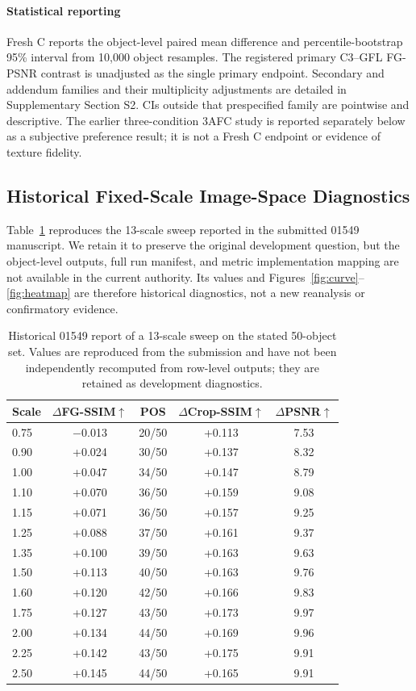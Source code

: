 \documentclass[times,twocolumn,final]{elsarticle}
\begin{document}
\paragraph{Statistical reporting}
Fresh C reports the object-level paired mean difference and percentile-bootstrap 95\% interval from 10{,}000 object resamples. The registered primary C3--GFL FG-PSNR contrast is unadjusted as the single primary endpoint. Secondary and addendum families and their multiplicity adjustments are detailed in Supplementary Section S2. CIs outside that prespecified family are pointwise and descriptive. The earlier three-condition 3AFC study is reported separately below as a subjective preference result; it is not a Fresh C endpoint or evidence of texture fidelity.

\subsection{Historical Fixed-Scale Image-Space Diagnostics}
\label{subsec:tradeoff}

Table~\ref{tab:sweep} reproduces the 13-scale sweep reported in the submitted 01549 manuscript. We retain it to preserve the original development question, but the object-level outputs, full run manifest, and metric implementation mapping are not available in the current authority. Its values and Figures~\ref{fig:curve}--\ref{fig:heatmap} are therefore historical diagnostics, not a new reanalysis or confirmatory evidence.

\begin{table}[t]
\centering
\caption{Historical 01549 report of a 13-scale sweep on the stated 50-object set. Values are reproduced from the submission and have not been independently recomputed from row-level outputs; they are retained as development diagnostics.}
\label{tab:sweep}
\small
\begin{tabular}{lcccc}
\toprule
Scale & $\Delta$FG-SSIM$\uparrow$ & POS & $\Delta$Crop-SSIM$\uparrow$ & $\Delta$PSNR$\uparrow$ \\
\midrule
0.75 & $-$0.013 & 20/50 & +0.113 & 7.53 \\
0.90 & +0.024 & 30/50 & +0.137 & 8.32 \\
1.00 & +0.047 & 34/50 & +0.147 & 8.79 \\
1.10 & +0.070 & 36/50 & +0.159 & 9.08 \\
1.15 & +0.071 & 36/50 & +0.157 & 9.25 \\
1.25 & +0.088 & 37/50 & +0.161 & 9.37 \\
1.35 & +0.100 & 39/50 & +0.163 & 9.63 \\
1.50 & +0.113 & 40/50 & +0.163 & 9.76 \\
1.60 & +0.120 & 42/50 & +0.166 & 9.83 \\
1.75 & +0.127 & 43/50 & +0.173 & 9.97 \\
2.00 & +0.134 & 44/50 & +0.169 & 9.96 \\
2.25 & +0.142 & 43/50 & +0.175 & 9.91 \\
2.50 & +0.145 & 44/50 & +0.165 & 9.91 \\
\bottomrule
\end{tabular}
\end{table}
\end{document}
